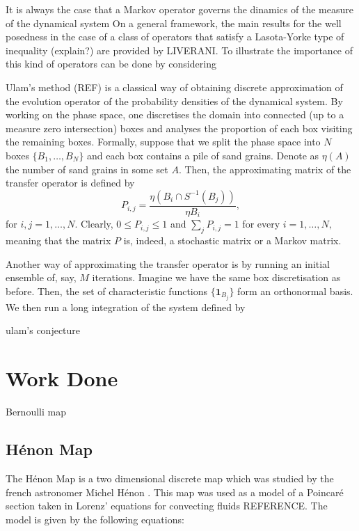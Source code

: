 It is always the case that a Markov operator governs the dinamics of the measure of the dynamical system On a general framework, the main results for the well posedness in the case of a class of operators that satisfy a Lasota-Yorke type of inequality (explain?) are provided by LIVERANI. To illustrate the importance of this kind of operators can be done by considering 

Ulam's method (REF) is a classical way of obtaining discrete approximation of the evolution operator of the probability densities of the dynamical system. By working on the phase space, one discretises the domain into connected (up to a measure zero intersection) boxes and analyses the proportion of each box visiting the remaining boxes. Formally, suppose that we split the phase space into $N$ boxes $\{B_1,\ldots,B_N\}$ and each box contains a pile of sand grains. Denote as $\eta (A)$ the number of sand grains in some set $A$. Then, the approximating matrix of the transfer operator is defined by
\begin{equation}
	P_{i,j}=\frac{\eta(B_i \cap S^{-1}(B_j))}{\eta B_i},
\end{equation}
for $i,j=1,\ldots , N$. Clearly, $0\leq P_{i,j}\leq 1$ and $\sum _j P_{i,j}=1$ for every $i=1,\ldots , N,$ meaning that the matrix $P$ is, indeed, a stochastic matrix or a Markov matrix.

Another way of approximating the transfer operator is by running an initial ensemble of, say, $M$ iterations. Imagine we have the same box discretisation as before. Then, the set of characteristic functions $\{\mathbf{1}_{B_j}\}$ form an orthonormal basis. We then run a long integration of the system defined by


ulam's conjecture


\section*{Work  Done}

Bernoulli map

\subsection*{H\'{e}non Map}

The H\'{e}non Map is a two dimensional discrete map which was studied by the french astronomer Michel H\'{e}non \cite{henon}. This map was used as a model of a Poincar\'{e} section taken in Lorenz' equations for convecting fluids REFERENCE. The model is given by the following equations:

